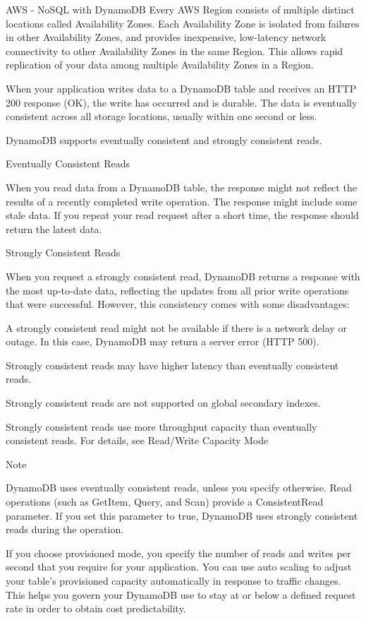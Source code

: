 \begin{frame}{AWS - NoSQL with DynamoDB}
Every AWS Region consists of multiple distinct locations called Availability Zones. Each Availability Zone is isolated from failures in other Availability Zones, and provides inexpensive, low-latency network connectivity to other Availability Zones in the same Region. This allows rapid replication of your data among multiple Availability Zones in a Region.

When your application writes data to a DynamoDB table and receives an HTTP 200 response (OK), the write has occurred and is durable. The data is eventually consistent across all storage locations, usually within one second or less.

DynamoDB supports eventually consistent and strongly consistent reads.

Eventually Consistent Reads

When you read data from a DynamoDB table, the response might not reflect the results of a recently completed write operation. The response might include some stale data. If you repeat your read request after a short time, the response should return the latest data.

Strongly Consistent Reads

When you request a strongly consistent read, DynamoDB returns a response with the most up-to-date data, reflecting the updates from all prior write operations that were successful. However, this consistency comes with some disadvantages:

    A strongly consistent read might not be available if there is a network delay or outage. In this case, DynamoDB may return a server error (HTTP 500).

    Strongly consistent reads may have higher latency than eventually consistent reads.

    Strongly consistent reads are not supported on global secondary indexes.

    Strongly consistent reads use more throughput capacity than eventually consistent reads. For details, see Read/Write Capacity Mode

Note

DynamoDB uses eventually consistent reads, unless you specify otherwise. Read operations (such as GetItem, Query, and Scan) provide a ConsistentRead parameter. If you set this parameter to true, DynamoDB uses strongly consistent reads during the operation.


If you choose provisioned mode, you specify the number of reads and writes per second that you require for your application. You can use auto scaling to adjust your table’s provisioned capacity automatically in response to traffic changes. This helps you govern your DynamoDB use to stay at or below a defined request rate in order to obtain cost predictability.


\end{frame}
